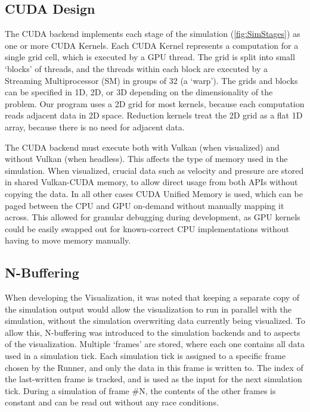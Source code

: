 \subsection{CUDA Design}\label{sec:Design:Simulation}

The CUDA backend implements each stage of the simulation (\cref{fig:SimStages}) as one or more CUDA Kernels.
Each CUDA Kernel represents a computation for a single grid cell, which is executed by a GPU thread.
The grid is split into small `blocks' of threads, and the threads within each block are executed by a Streaming Multiprocessor (SM) in groups of 32 (a `warp').%
The grids and blocks can be specified in 1D, 2D, or 3D depending on the dimensionality of the problem.
Our program uses a 2D grid for most kernels, because each computation reads adjacent data in 2D space.
Reduction kernels treat the 2D grid as a flat 1D array, because there is no need for adjacent data.

The CUDA backend must execute both with Vulkan (when visualized) and without Vulkan (when headless).
This affects the type of memory used in the simulation.
When visualized, crucial data such as velocity and pressure are stored in shared Vulkan-CUDA memory, to allow direct usage from both APIs without copying the data.
In all other cases CUDA Unified Memory is used, which can be paged between the CPU and GPU on-demand without manually mapping it across\cite{Harris2017UnifiedBlog}.
This allowed for granular debugging during development, as GPU kernels could be easily swapped out for known-correct CPU implementations without having to move memory manually.


\subsection{N-Buffering}\label{sec:DesignSimNBuffer}
When developing the Visualization, it was noted that keeping a separate copy of the simulation output would allow the visualization to run in parallel with the simulation, without the simulation overwriting data currently being visualized.
To allow this, N-buffering was introduced to the simulation backends and to aspects of the visualization.
Multiple `frames' are stored, where each one contains all data used in a simulation tick.
Each simulation tick is assigned to a specific frame chosen by the Runner, and only the data in this frame is written to.
The index of the last-written frame is tracked, and is used as the input for the next simulation tick.
During a simulation of frame \#N, the contents of the other frames is constant and can be read out without any race conditions.

